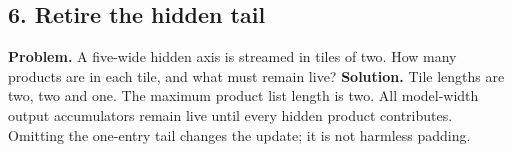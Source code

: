 \subsection*{6. Retire the hidden tail}
\textbf{Problem.} A five-wide hidden axis is streamed in tiles of two.
How many products are in each tile, and what must remain live?
\textbf{Solution.} Tile lengths are two, two and one. The maximum product
list length is two. All model-width output accumulators remain live
until every hidden product contributes. Omitting the one-entry tail
changes the update; it is not harmless padding.

